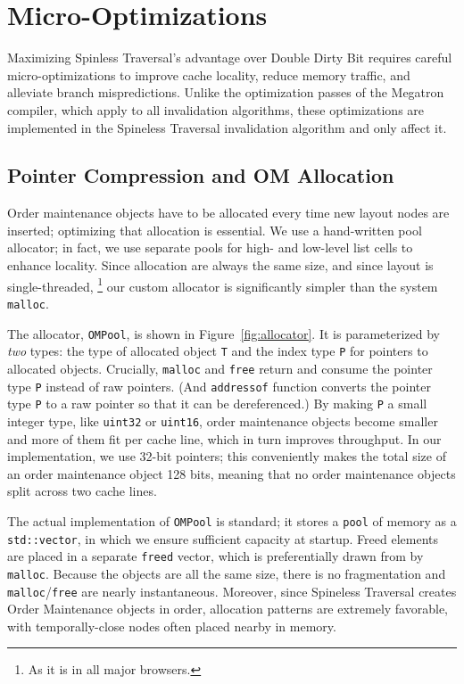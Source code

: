 \section{Micro-Optimizations}
\label{sec:opt}

Maximizing Spinless Traversal's advantage
  over Double Dirty Bit
  requires careful micro-optimizations
  to improve cache locality,
  reduce memory traffic,
  and alleviate branch mispredictions.
Unlike the optimization passes of the Megatron compiler,
  which apply to all invalidation algorithms,
  these optimizations are implemented
  in the Spineless Traversal invalidation algorithm
  and only affect it.

\subsection{Pointer Compression and OM Allocation}

Order maintenance objects have to be allocated every time
  new layout nodes are inserted;
  optimizing that allocation is essential.
We use a hand-written pool allocator;
  in fact, we use separate pools
  for high- and low-level list cells
  to enhance locality.
Since allocation are always the same size,
  and since layout is single-threaded,%
\footnote{As it is in all major browsers.}
  our custom allocator is significantly
  simpler than the system \texttt{malloc}.

The allocator, \texttt{OMPool},
  is shown in Figure~\ref{fig:allocator}.
It is parameterized by \emph{two} types:
  the type of allocated object \texttt{T}
  and the index type \texttt{P} for pointers to allocated objects.
Crucially,
  \texttt{malloc} and \texttt{free} return and consume
  the pointer type \texttt{P} instead of raw pointers.
(And \texttt{addressof} function converts
  the pointer type \texttt{P} to a raw pointer
  so that it can be dereferenced.)
By making \texttt{P} a small integer type,
  like \texttt{uint32} or \texttt{uint16},
  order maintenance objects become smaller
  and more of them fit per cache line,
  which in turn improves throughput.
In our implementation, we use 32-bit pointers;
  this conveniently makes the total size
  of an order maintenance object 128 bits,
  meaning that no order maintenance objects split across two cache lines.

The actual implementation of \texttt{OMPool} is standard;
  it stores a \texttt{pool} of memory as a \texttt{std::vector},
  in which we ensure sufficient capacity at startup.
Freed elements are placed in a separate \texttt{freed} vector,
  which is preferentially drawn from by \texttt{malloc}.
Because the objects are all the same size,
  there is no fragmentation and \texttt{malloc}/\texttt{free}
  are nearly instantaneous.
Moreover, since Spineless Traversal
  creates Order Maintenance objects in order,
  allocation patterns are extremely favorable,
  with temporally-close nodes often placed nearby in memory.

